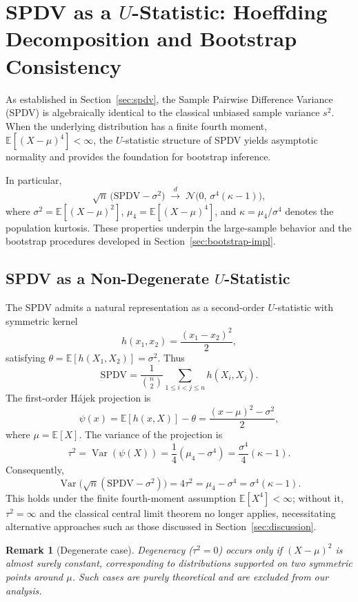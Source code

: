\documentclass[12pt,a4paper]{article}
\newtheorem{remark}{Remark}
\begin{document}
\section{SPDV as a $U$-Statistic: Hoeffding Decomposition and Bootstrap Consistency}\label{sec:ustat}

As established in Section~\ref{sec:spdv}, the Sample Pairwise Difference Variance (SPDV) is algebraically identical to the classical unbiased sample variance $s^2$. When the underlying distribution has a finite fourth moment, $\mathbb{E}[(X-\mu)^4] < \infty$, the $U$-statistic structure of SPDV yields asymptotic normality and provides the foundation for bootstrap inference.

In particular,
\[
\sqrt{n}\,\bigl(\text{SPDV} - \sigma^2\bigr)
\;\xrightarrow{d}\;
\mathcal{N}\bigl(0,\,\sigma^4(\kappa-1)\bigr),
\]
where $\sigma^2 = \mathbb{E}[(X-\mu)^2]$, $\mu_4=\mathbb{E}[(X-\mu)^4]$, and $\kappa = \mu_4/\sigma^4$ denotes the population kurtosis. These properties underpin the large-sample behavior and the bootstrap procedures developed in Section~\ref{sec:bootstrap-impl}.

\subsection{SPDV as a Non-Degenerate $U$-Statistic}\label{subsec:non-degenerate}

The SPDV admits a natural representation as a second-order $U$-statistic with symmetric kernel
\[
h(x_1,x_2) = \frac{(x_1 - x_2)^2}{2},
\]
satisfying $\theta = \mathbb{E}[h(X_1,X_2)] = \sigma^2$. Thus
\[
\text{SPDV}
=
\frac{1}{\binom{n}{2}}
\sum_{1 \le i < j \le n}
h(X_i,X_j).
\]
The first-order Hájek projection is
\[
\psi(x)
=
\mathbb{E}[h(x,X)] - \theta
=
\frac{(x-\mu)^2 - \sigma^2}{2},
\]
where $\mu = \mathbb{E}[X]$. The variance of the projection is
\[
\tau^2
=
\operatorname{Var}(\psi(X))
=
\frac{1}{4}(\mu_4 - \sigma^4)
=
\frac{\sigma^4}{4}(\kappa - 1).
\]
Consequently,
\[
\operatorname{Var}\bigl(\sqrt{n}(\text{SPDV}-\sigma^2)\bigr)
=
4\tau^2
=
\mu_4 - \sigma^4
=
\sigma^4(\kappa-1).
\]
This holds under the finite fourth-moment assumption $\mathbb{E}[X^4] < \infty$; without it, $\tau^2 = \infty$ and the classical central limit theorem no longer applies, necessitating alternative approaches such as those discussed in Section~\ref{sec:discussion}.

\begin{remark}[Degenerate case]
Degeneracy ($\tau^2=0$) occurs only if $(X-\mu)^2$ is almost surely constant, corresponding to distributions supported on two symmetric points around $\mu$. Such cases are purely theoretical and are excluded from our analysis.
\end{remark}
\end{document}
